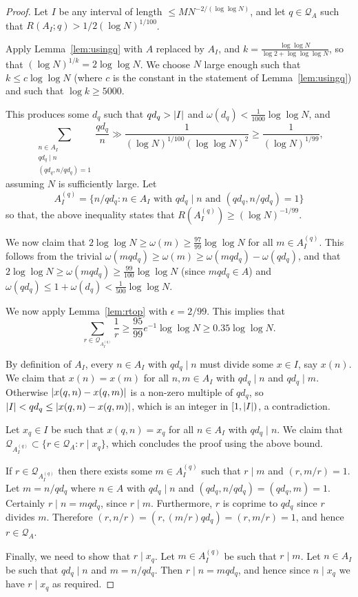 \begin{proof}
  \leanok
Let $I$ be any interval of length $\leq MN^{-2/(\log\log N)}$, and let $q\in\mathcal{Q}_A$ such that $R(A_I;q)> 1/2(\log N)^{1/100}$.

Apply Lemma~\ref{lem:usingq} with $A$ replaced by $A_I$, and $k=\frac{\log\log N}{\log 2+\log\log\log N}$, so that $(\log N)^{1/k}=2\log\log N$. We choose $N$ large enough such that $k\leq c\log\log N$ (where $c$ is the constant in the statement of Lemma~\ref{lem:usingq}) and such that $\log k\geq 5000$.

This produces some $d_q$ such that $qd_q>\left\lvert I\right\rvert$ and $\omega(d_q)<\tfrac{1}{1000}\log\log N$, and
  \[\sum_{\substack{n\in A_I\\ qd_q\mid n\\ (qd_q,n/qd_q)=1}}\frac{qd_q}{n}\gg \frac{1}{(\log N)^{1/100}(\log\log N)^2}\geq \frac{1}{(\log N)^{1/99}},\]
assuming $N$ is sufficiently large. Let
  \[A_I^{(q)}=\{ n/qd_q : n\in A_I\textrm{ with }qd_q\mid n\textrm{ and }(qd_q,n/qd_q)=1\}\]
  so that, the above inequality states that $R(A_I^{(q)})\geq (\log N)^{-1/99}$.

We now claim that $2\log\log N\geq \omega(m) \geq \tfrac{97}{99}\log\log N$ for all $m\in A_I^{(q)}$. This follows from the trivial $\omega(mqd_q)\geq \omega(m)\geq \omega(mqd_q)-\omega(qd_q)$, and that $2\log\log N\geq \omega(mqd_q)\geq  \frac{99}{100}\log\log N$ (since $mqd_q\in A$) and $\omega(qd_q)\leq 1+\omega(d_q)<\frac{1}{500}\log\log N$.

We now apply Lemma~\ref{lem:rtop} with $\epsilon=2/99$. This implies that
  \[\sum_{r\in \mathcal{Q}_{A_I^{(q)}}}\frac{1}{r}\geq \frac{95}{99}e^{-1}\log\log N\geq 0.35\log\log N.\]


    By definition of $A_I$, every $n\in A_I$ with $qd_q\mid n$ must divide some $x\in I$, say $x(n)$. We claim that $x(n)=x(m)$ for all $n,m\in A_I$ with $qd_q\mid n$ and $qd_q\mid m$. Otherwise $\left\lvert x(q,n)-x(q,m)\right\rvert$ is a non-zero multiple of $qd_q$, so $\left\lvert I\right\rvert<qd_q\leq \left\lvert x(q,n)-x(q,m)\right\rvert$, which is an integer in $[1,\left\lvert I\right\rvert)$, a contradiction.

  Let $x_q\in I$ be such that $x(q,n)=x_q$ for all $n\in A_I$ with $qd_q \mid n$. We claim that $\mathcal{Q}_{A_I^{(q)}}\subset \{ r\in \mathcal{Q}_A : r\mid x_q\}$, which concludes the proof using the above bound.

If $r\in \mathcal{Q}_{A_I^{(q)}}$ then there exists some $m\in A_I^{(q)}$ such that $r\mid m$ and $(r,m/r)=1$. Let $m=n/qd_q$ where $n\in A$ with $qd_q\mid n$ and $(qd_q,n/qd_q)=(qd_q,m)=1$. Certainly $r\mid n = mqd_q$, since $r\mid m$. Furthermore, $r$ is coprime to $qd_q$ since $r$ divides $m$. Therefore $(r,n/r)=(r,(m/r)qd_q)=(r,m/r)=1$, and hence $r\in \mathcal{Q}_A$.

Finally, we need to show that $r\mid x_q$. Let $m\in A_I^{(q)}$ be such that $r\mid m$. Let $n\in A_I$ be such that $qd_q\mid n$ and $m=n/qd_q$. Then $r\mid n=mqd_q$, and hence since $n\mid x_q$ we have $r\mid x_q$ as required.
\end{proof}

